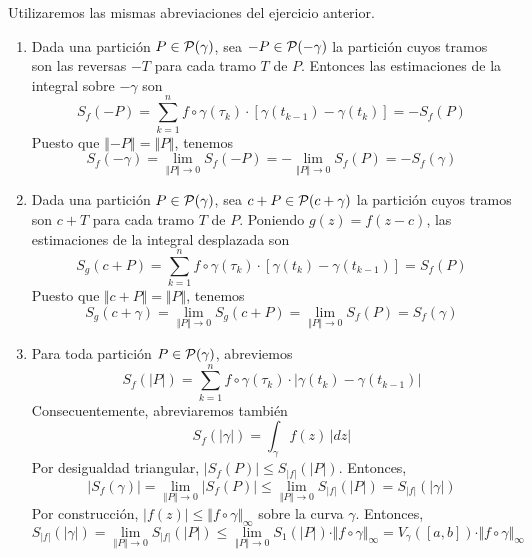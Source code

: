 \begin{solution}
Utilizaremos las mismas abreviaciones del ejercicio anterior.

\begin{enumerate}[label=(\alph*)]
    \item Dada una partición $P \in \P(\gamma)$, sea $-P \in \P(-\gamma)$ la partición cuyos tramos son las reversas $-T$ para cada tramo $T$ de $P$. Entonces las estimaciones de la integral sobre $-\gamma$ son
    $$S_f(-P) = \sum_{k=1}^n f \circ \gamma(\tau_k) \cdot [\gamma(t_{k-1}) - \gamma(t_k)] = -S_f(P)$$
    Puesto que $\left \Vert -P \right \Vert = \Vert P \Vert$, tenemos
    $$S_f(-\gamma) = \lim_{\Vert P \Vert \to 0} S_f(-P) = -\lim_{\Vert P \Vert \to 0} S_f(P) = -S_f(\gamma)$$
    
    \item Dada una partición $P \in \P(\gamma)$, sea $c + P \in \P(c + \gamma)$ la partición cuyos tramos son $c + T$ para cada tramo $T$ de $P$. Poniendo $g(z) = f(z-c)$, las estimaciones de la integral desplazada son
    $$S_g(c + P) = \sum_{k=1}^n f \circ \gamma(\tau_k) \cdot [\gamma(t_k) - \gamma(t_{k-1})] = S_f(P)$$
    Puesto que $\Vert c + P \Vert = \Vert P \Vert$, tenemos
    $$S_g(c + \gamma) = \lim_{\Vert P \Vert \to 0} S_g(c + P) = \lim_{\Vert P \Vert \to 0} S_f(P) = S_f(\gamma)$$
    
    \item Para toda partición $P \in \P(\gamma)$, abreviemos
    $$S_f(|P|) = \sum_{k=1}^n f \circ \gamma(\tau_k) \cdot |\gamma(t_k) - \gamma(t_{k-1})|$$
    Consecuentemente, abreviaremos también
    $$S_f(|\gamma|) = \int_\gamma f(z) \, |dz|$$
    Por desigualdad triangular, $|S_f(P)| \le S_{|f|}(|P|)$. Entonces,
    $$|S_f(\gamma)| = \lim_{\Vert P \Vert \to 0} |S_f(P)| \le \lim_{\Vert P \Vert \to 0} S_{|f|}(|P|) = S_{|f|}(|\gamma|)$$
    Por construcción, $|f(z)| \le \Vert f \circ \gamma \Vert_\infty$ sobre la curva $\gamma$. Entonces,
    $$
    S_{|f|}(|\gamma|)
        = \lim_{\Vert P \Vert \to 0} S_{|f|}(|P|)
        \le \lim_{\Vert P \Vert \to 0} S_1(|P|) \cdot \Vert f \circ \gamma \Vert_\infty
        = V_\gamma([a,b]) \cdot \Vert f \circ \gamma \Vert_\infty
    $$
\end{enumerate}
\end{solution}
